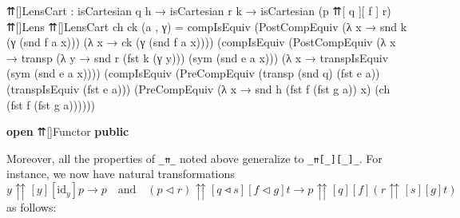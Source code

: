 \documentclass[
  11pt,
  oneside,
  article]{memoir}
\newenvironment{Shaded}{}{}
\newcommand{\KeywordTok}[1]{\textcolor[rgb]{0.00,0.44,0.13}{\textbf{#1}}}
\newcommand{\NormalTok}[1]{#1}
\newcommand{\OtherTok}[1]{\textcolor[rgb]{0.00,0.44,0.13}{#1}}
\theoremstyle{definition}
\theoremstyle{plain}
\newcommand{\0}{\textsf{0}}
\newcommand{\1}{\tn{\textsf{1}}}
\begin{document}
\begin{Shaded}
\begin{Highlighting}[]
\NormalTok{    ⇈[]LensCart }\OtherTok{:}\NormalTok{ isCartesian q h }\OtherTok{→}\NormalTok{ isCartesian r\textquotesingle{} k}
                  \OtherTok{→}\NormalTok{ isCartesian }\OtherTok{(}\NormalTok{p\textquotesingle{} ⇈[ q\textquotesingle{} ][ f\textquotesingle{} ] r\textquotesingle{}}\OtherTok{)}\NormalTok{ ⇈[]Lens}
\NormalTok{    ⇈[]LensCart ch ck }\OtherTok{(}\NormalTok{a , γ}\OtherTok{)} \OtherTok{=} 
\NormalTok{        compIsEquiv }
            \OtherTok{(}\NormalTok{PostCompEquiv }\OtherTok{(λ}\NormalTok{ x }\OtherTok{→}\NormalTok{ snd k }\OtherTok{(}\NormalTok{γ }\OtherTok{(}\NormalTok{snd f a x}\OtherTok{)))} 
                           \OtherTok{(λ}\NormalTok{ x }\OtherTok{→}\NormalTok{ ck }\OtherTok{(}\NormalTok{γ }\OtherTok{(}\NormalTok{snd f a x}\OtherTok{))))} 
            \OtherTok{(}\NormalTok{compIsEquiv }
                \OtherTok{(}\NormalTok{PostCompEquiv }
                    \OtherTok{(λ}\NormalTok{ x }\OtherTok{→}\NormalTok{ transp }\OtherTok{(λ}\NormalTok{ y }\OtherTok{→}\NormalTok{ snd r\textquotesingle{} }\OtherTok{(}\NormalTok{fst k }\OtherTok{(}\NormalTok{γ y}\OtherTok{)))} 
                                  \OtherTok{(}\NormalTok{sym }\OtherTok{(}\NormalTok{snd e a x}\OtherTok{)))} 
                    \OtherTok{(λ}\NormalTok{ x }\OtherTok{→}\NormalTok{ transpIsEquiv }\OtherTok{(}\NormalTok{sym }\OtherTok{(}\NormalTok{snd e a x}\OtherTok{))))} 
                \OtherTok{(}\NormalTok{compIsEquiv }
                    \OtherTok{(}\NormalTok{PreCompEquiv }\OtherTok{(}\NormalTok{transp }\OtherTok{(}\NormalTok{snd q}\OtherTok{)} \OtherTok{(}\NormalTok{fst e a}\OtherTok{))} 
                                  \OtherTok{(}\NormalTok{transpIsEquiv }\OtherTok{(}\NormalTok{fst e a}\OtherTok{)))} 
                    \OtherTok{(}\NormalTok{PreCompEquiv }\OtherTok{(λ}\NormalTok{ x }\OtherTok{→}\NormalTok{ snd h }\OtherTok{(}\NormalTok{fst f\textquotesingle{} }\OtherTok{(}\NormalTok{fst g a}\OtherTok{))}\NormalTok{ x}\OtherTok{)} 
                                  \OtherTok{(}\NormalTok{ch }\OtherTok{(}\NormalTok{fst f\textquotesingle{} }\OtherTok{(}\NormalTok{fst g a}\OtherTok{))))))}

\KeywordTok{open}\NormalTok{ ⇈[]Functor }\KeywordTok{public}
\end{Highlighting}
\end{Shaded}

Moreover, all the properties of \texttt{\_⇈\_} noted above generalize to
\texttt{\_⇈{[}\_{]}{[}\_{]}\_}. For instance, we now have natural
transformations \[
y {\upuparrows}[y][\text{id}_{y}] p \to p \quad \text{and} \quad
(p \triangleleft r) {\upuparrows}[q ◃ s][f \triangleleft g] t \to p {\upuparrows}[q][f] (r {\upuparrows}[s][g] t)
\] as follows:
\end{document}
